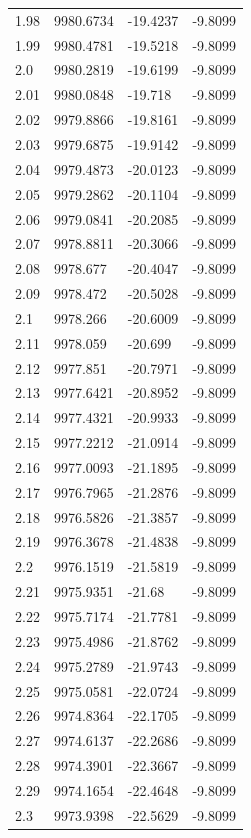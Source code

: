 \begin{table}[H]
\begin{tabular}{llll}
1.98 & 9980.6734 & -19.4237 & -9.8099 \\
1.99 & 9980.4781 & -19.5218 & -9.8099 \\
2.0 & 9980.2819 & -19.6199 & -9.8099 \\
2.01 & 9980.0848 & -19.718 & -9.8099 \\
2.02 & 9979.8866 & -19.8161 & -9.8099 \\
2.03 & 9979.6875 & -19.9142 & -9.8099 \\
2.04 & 9979.4873 & -20.0123 & -9.8099 \\
2.05 & 9979.2862 & -20.1104 & -9.8099 \\
2.06 & 9979.0841 & -20.2085 & -9.8099 \\
2.07 & 9978.8811 & -20.3066 & -9.8099 \\
2.08 & 9978.677 & -20.4047 & -9.8099 \\
2.09 & 9978.472 & -20.5028 & -9.8099 \\
2.1 & 9978.266 & -20.6009 & -9.8099 \\
2.11 & 9978.059 & -20.699 & -9.8099 \\
2.12 & 9977.851 & -20.7971 & -9.8099 \\
2.13 & 9977.6421 & -20.8952 & -9.8099 \\
2.14 & 9977.4321 & -20.9933 & -9.8099 \\
2.15 & 9977.2212 & -21.0914 & -9.8099 \\
2.16 & 9977.0093 & -21.1895 & -9.8099 \\
2.17 & 9976.7965 & -21.2876 & -9.8099 \\
2.18 & 9976.5826 & -21.3857 & -9.8099 \\
2.19 & 9976.3678 & -21.4838 & -9.8099 \\
2.2 & 9976.1519 & -21.5819 & -9.8099 \\
2.21 & 9975.9351 & -21.68 & -9.8099 \\
2.22 & 9975.7174 & -21.7781 & -9.8099 \\
2.23 & 9975.4986 & -21.8762 & -9.8099 \\
2.24 & 9975.2789 & -21.9743 & -9.8099 \\
2.25 & 9975.0581 & -22.0724 & -9.8099 \\
2.26 & 9974.8364 & -22.1705 & -9.8099 \\
2.27 & 9974.6137 & -22.2686 & -9.8099 \\
2.28 & 9974.3901 & -22.3667 & -9.8099 \\
2.29 & 9974.1654 & -22.4648 & -9.8099 \\
2.3 & 9973.9398 & -22.5629 & -9.8099 \\

\end{tabular}
\end{table}
